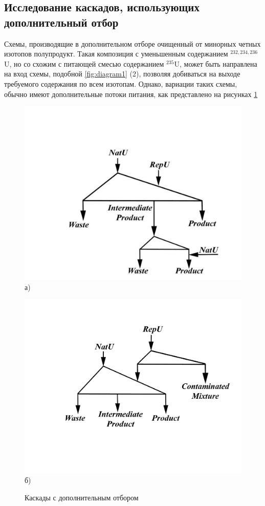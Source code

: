 \subsection{Исследование каскадов, использующих дополнительный отбор}
Схемы, производящие в дополнительном отборе очищенный от минорных четных изотопов полупродукт. Такая композиция с уменьшенным содержанием $^{232,234,236}$U, но со схожим с питающей смесью содержанием $^{235}$U, может быть направлена на вход схемы, подобной \ref{fig:diagram1} (2), позволяя добиваться на выходе требуемого содержания по всем изотопам. Однако, вариации таких схемы, обычно имеют дополнительные потоки питания, как представлено на рисунках \ref{fig:add}

\begin{figure}[ht]
  \begin{minipage}[b][][b]{0.49\linewidth}\centering
    \includegraphics[width=0.9\linewidth]{cascades/add_p} \\ а)
  \end{minipage}
  \hfill
  \begin{minipage}[b][][b]{0.49\linewidth}\centering
    \includegraphics[width=0.9\linewidth]{cascades/add_p2} \\ б)
  \end{minipage}
  \caption{Каскады с дополнительным отбором}
  \label{fig:add}
\end{figure}

